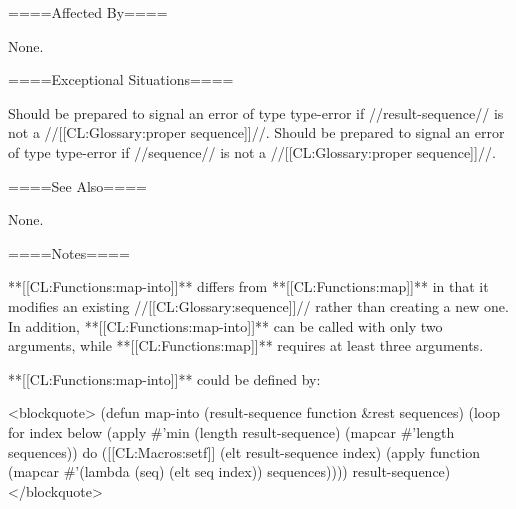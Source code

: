 ====Affected By====

None.

====Exceptional Situations====

Should be prepared to signal an error of type type-error if //result-sequence// is not a //[[CL:Glossary:proper sequence]]//. Should be prepared to signal an error of type type-error if //sequence// is not a //[[CL:Glossary:proper sequence]]//.

====See Also====

None.

====Notes====

**[[CL:Functions:map-into]]** differs from **[[CL:Functions:map]]** in that it modifies an existing //[[CL:Glossary:sequence]]// rather than creating a new one. In addition, **[[CL:Functions:map-into]]** can be called with only two arguments, while **[[CL:Functions:map]]** requires at least three arguments.

**[[CL:Functions:map-into]]** could be defined by:

<blockquote> (defun map-into (result-sequence function &rest sequences) (loop for index below (apply #'min (length result-sequence) (mapcar #'length sequences)) do ([[CL:Macros:setf]] (elt result-sequence index) (apply function (mapcar #'(lambda (seq) (elt seq index)) sequences)))) result-sequence) </blockquote>



